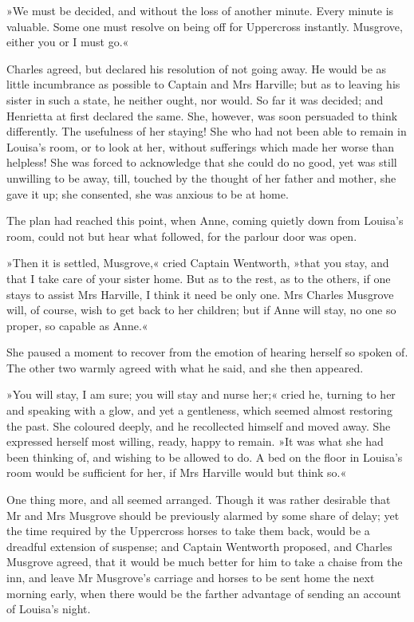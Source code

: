 »We must be decided, and without the loss of another minute. Every minute is valuable. Some one must resolve on being off for Uppercross instantly. Musgrove, either you or I must go.«

Charles agreed, but declared his resolution of not going away. He would be as little incumbrance as possible to Captain and Mrs Harville; but as to leaving his sister in such a state, he neither ought, nor would. So far it was decided; and Henrietta at first declared the same. She, however, was soon persuaded to think differently. The usefulness of her staying! She who had not been able to remain in Louisa's room, or to look at her, without sufferings which made her worse than helpless! She was forced to acknowledge that she could do no good, yet was still unwilling to be away, till, touched by the thought of her father and mother, she gave it up; she consented, she was anxious to be at home.

The plan had reached this point, when Anne, coming quietly down from Louisa's room, could not but hear what followed, for the parlour door was open.

»Then it is settled, Musgrove,« cried Captain Wentworth, »that you stay, and that I take care of your sister home. But as to the rest, as to the others, if one stays to assist Mrs Harville, I think it need be only one. Mrs Charles Musgrove will, of course, wish to get back to her children; but if Anne will stay, no one so proper, so capable as Anne.«

She paused a moment to recover from the emotion of hearing herself so spoken of. The other two warmly agreed with what he said, and she then appeared.

»You will stay, I am sure; you will stay and nurse her;« cried he, turning to her and speaking with a glow, and yet a gentleness, which seemed almost restoring the past. She coloured deeply, and he recollected himself and moved away. She expressed herself most willing, ready, happy to remain. »It was what she had been thinking of, and wishing to be allowed to do. A bed on the floor in Louisa's room would be sufficient for her, if Mrs Harville would but think so.«

One thing more, and all seemed arranged. Though it was rather desirable that Mr and Mrs Musgrove should be previously alarmed by some share of delay; yet the time required by the Uppercross horses to take them back, would be a dreadful extension of suspense; and Captain Wentworth proposed, and Charles Musgrove agreed, that it would be much better for him to take a chaise from the inn, and leave Mr Musgrove's carriage and horses to be sent home the next morning early, when there would be the farther advantage of sending an account of Louisa's night.

